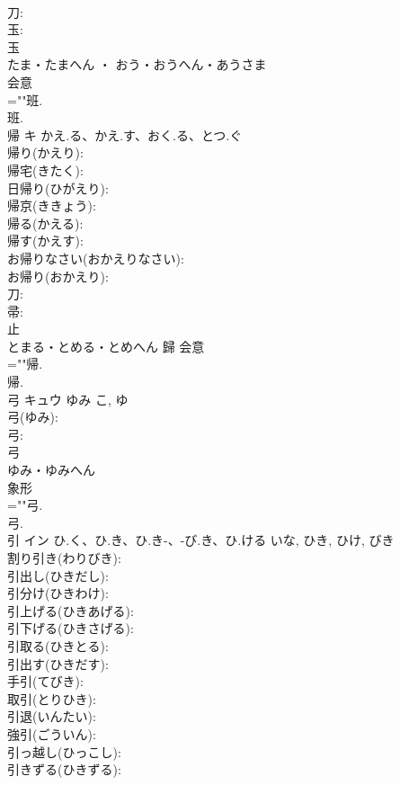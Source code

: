 \documentclass[8pt]{extreport}
\begin{document}
\begin{CJK}{UTF8}{min}
\\	刀: 
\\	玉: 
\\	玉	
\\	たま・たまへん ・ おう・おうへん・あうさま	
\\	会意 
\\	=""班.
\\	班.
\\	帰	キ	かえ.る、かえ.す、おく.る、とつ.ぐ		
\\	帰り(かえり): 
\\	帰宅(きたく): 
\\	日帰り(ひがえり): 
\\	帰京(ききょう): 
\\	帰る(かえる): 
\\	帰す(かえす): 
\\	お帰りなさい(おかえりなさい): 
\\	お帰り(おかえり): 
\\	刀: 
\\	帚: 
\\	止	
\\	とまる・とめる・とめへん	歸	会意 
\\	=""帰.
\\	帰.
\\	弓	キュウ	ゆみ	こ, ゆ	
\\	弓(ゆみ): 
\\	弓: 
\\	弓	
\\	ゆみ・ゆみへん	
\\	象形 
\\	=""弓.
\\	弓.
\\	引	イン	ひ.く、ひ.き、ひ.き-、-び.き、ひ.ける	いな, ひき, ひけ, びき	
\\	割り引き(わりびき): 
\\	引出し(ひきだし): 
\\	引分け(ひきわけ): 
\\	引上げる(ひきあげる): 
\\	引下げる(ひきさげる): 
\\	引取る(ひきとる): 
\\	引出す(ひきだす): 
\\	手引(てびき): 
\\	取引(とりひき): 
\\	引退(いんたい): 
\\	強引(ごういん): 
\\	引っ越し(ひっこし): 
\\	引きずる(ひきずる): 

\end{CJK}
\end{document}
